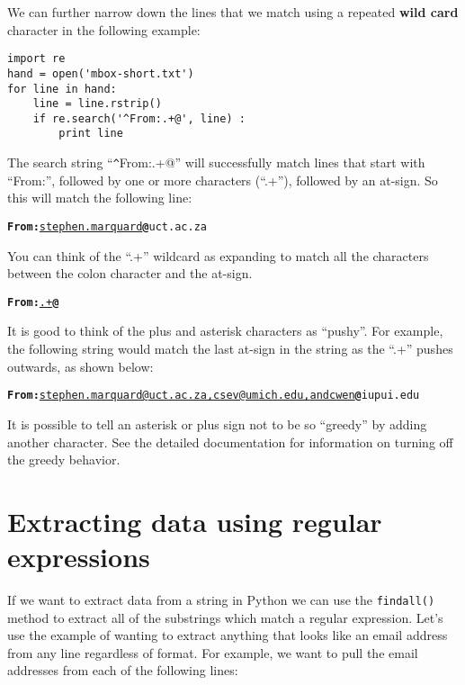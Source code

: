 We can further narrow down the lines that we match using a repeated {\bf wild card} character in
the following example:

\beforeverb
\begin{verbatim}
import re
hand = open('mbox-short.txt')
for line in hand:
    line = line.rstrip()
    if re.search('^From:.+@', line) :
        print line
\end{verbatim}
\afterverb
%
The search string ``\verb"^"From:.+@'' will successfully match lines that start with ``From:'',
followed by one or more characters (``.+''), followed by an at-sign.  So this will match the
following line:

\beforeverb
\begin{alltt}
{\bf From:}\underline{ stephen.marquard}{\bf @}uct.ac.za
\end{alltt}
\afterverb

You can think of the ``.+'' wildcard as expanding to match all the characters between the 
colon character and the at-sign.  

\beforeverb
\begin{alltt}
{\bf From:}\underline{.+}{\bf @}
\end{alltt}
\afterverb

It is good to think of the plus and asterisk characters as ``pushy''.  For example, the following
string would match the last at-sign in the string as the ``.+'' pushes outwards, as shown below:

\beforeverb
\begin{alltt}
{\bf From:}\underline{ stephen.marquard@uct.ac.za, csev@umich.edu, and cwen}{\bf @}iupui.edu
\end{alltt}
\afterverb

It is possible to tell an asterisk or plus sign not to be so ``greedy'' by adding 
another character.   See the detailed documentation for information on turning off the 
greedy behavior.

\section{Extracting data using regular expressions}

If we want to extract data from a string in Python we can use the {\tt findall()} method to extract
all of the substrings which match a regular expression.  Let's use the example of wanting to extract
anything that looks like an email address from any line regardless of format.  For example, we want
to pull the email addresses from each of the following lines:

